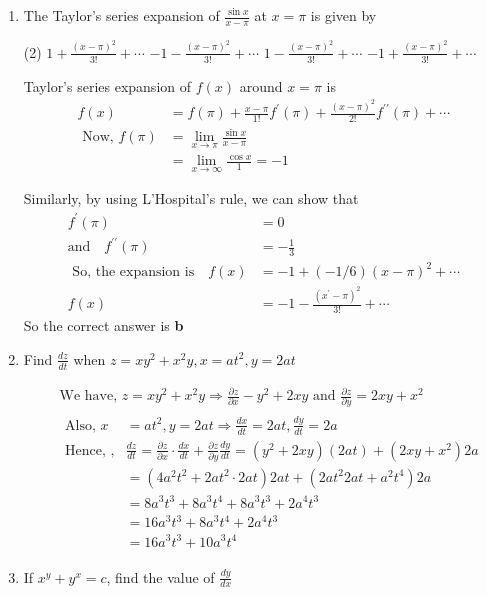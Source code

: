 \begin{enumerate}
\begin{answer}
\end{answer}

\item The Taylor's series expansion of $\frac{\sin x}{x-\pi}$ at $x=\pi$ is given by
\begin{tasks}(2)
	\task[\textbf{a.}] $1+\frac{(x-\pi)^{2}}{3 !}+\cdots$ 
	\task[\textbf{b.}]$-1-\frac{(x-\pi)^{2}}{3 !}+\cdots$
	\task[\textbf{c.}]$1-\frac{(x-\pi)^{2}}{3 !}+\cdots$ 
	\task[\textbf{d.}]  $-1+\frac{(x-\pi)^{2}}{3 !}+\cdots$
\end{tasks}
\begin{answer}
	Taylor's series expansion of $f(x)$ around $x=\pi$ is
	\begin{align*}
	f(x)&=f(\pi)+\frac{x-\pi}{1 !} f^{\prime}(\pi)+\frac{(x-\pi)^{2}}{2 !} f^{\prime \prime}(\pi)+\cdots \\
	\text { Now, } f(\pi)&=\lim _{x \rightarrow \pi} \frac{\sin x}{x-\pi}\\&=\lim _{x \rightarrow \infty} \frac{\cos x}{1}=-1
	\end{align*}
	
	Similarly, by using L'Hospital's rule, we can show that
	\begin{align*}
	f^{\prime}(\pi)&=0\\\text{and} \quad f^{\prime \prime}(\pi)&=-\frac{1}{3}\\
	\text{	So, the expansion is}\quad f(x)&=-1+(-1 / 6)(x-\pi)^{2}+\cdots\\
	f(x)&=-1-\frac{\left(x^{\prime}-\pi\right)^{2}}{3 !}+\cdots
	\end{align*}
	So the correct answer is {\textbf{b}}
\end{answer}

\item Find $\frac{d z}{d t}$ when $z=x y^{2}+x^{2} y, x=a t^{2}, y=2 a t$
\begin{answer}
	\begin{align*}
		&\text { We have, } z=x y^{2}+x^{2} y \Rightarrow \frac{\partial z}{\partial x}-y^{2}+2 x y \text { and } \frac{\partial z}{\partial y}=2 x y+x^{2}\\
		&\begin{aligned}
			\text { Also, } x &=a t^{2}, y=2 a t \Rightarrow \frac{d x}{d t}=2 a t, \frac{d y}{d t}=2 a \\
			\text { Hence, }, & \frac{d z}{d t}=\frac{\partial z}{\partial x} \cdot \frac{d x}{d t}+\frac{\partial z}{\partial y} \frac{d y}{d t}=\left(y^{2}+2 x y\right)(2 a t)+\left(2 x y+x^{2}\right) 2 a \\
			&=\left(4 a^{2} t^{2}+2 a t^{2} \cdot 2 a t\right) 2 a t+\left(2 a t^{2} 2 a t+a^{2} t^{4}\right) 2 a \\
			&=8 a^{3} t^{3}+8 a^{3} t^{4}+8 a^{3} t^{3}+2 a^{4} t^{3}\\&=16 a^{3} t^{3}+8 a^{3} t^{4}+2 a^{4} t^{3}\\&=16 a^{3} t^{3}+10 a^{3} t^{4}
		\end{aligned}
	\end{align*}
\end{answer}
\item 
 If  $x^{y}+y^{x}=c$,  find the value of $ \frac{d y}{d x}$



\end{enumerate}
